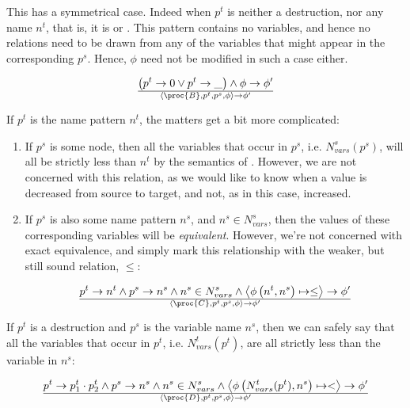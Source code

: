 This has a symmetrical case. Indeed when $p^t$ is neither a destruction, nor
any name $n^t$, that is, it is \mono{\_} or . This pattern contains no
variables, and hence  no relations need to be drawn from any of the variables
that might appear in the corresponding $p^s$. Hence, $\phi$ need not be
modified in such a case either.

\begin{equation}
{
\left(
    p^t\rightarrow 0
\vee
    p^t\rightarrow \_
\right)
  \wedge
    \phi\rightarrow\phi'
}\over{
  \left\langle\proc{B},p^t,p^s,\phi\right\rangle
  \rightarrow
  \phi'
}
\end{equation}

If $p^t$ is the name pattern $n^t$, the matters get a bit more complicated:

\begin{enumerate}

\item If $p^s$ is some node, then all the variables that occur in $p^s$, i.e.
$N_{vars}^s(p^s)$, will all be strictly less than $n^t$ by the semantics of
\D{}. However, we are not concerned with this relation, as we would like to
know when a value is decreased from source to target, and not, as in this case,
increased.

\item If $p^s$ is also some name pattern $n^s$, and  $n^s\in N^s_{vars}$, then
the values of these corresponding variables will be \emph{equivalent}. However,
we're not concerned with exact equivalence, and simply mark this relationship
with the weaker, but still sound relation, $\leq$:

\begin{equation}
{
    p^t\rightarrow n^t
  \wedge
    p^s\rightarrow n^s
  \wedge
    n^s\in N_{vars}^s
  \wedge
    \left\langle\phi\left(n^t, n^s\right)\mapsto \leq\right\rangle\rightarrow\phi'
}\over{
  \left\langle\proc{C},p^t,p^s,\phi\right\rangle
  \rightarrow
  \phi'
}
\end{equation}

\end{enumerate}

If $p^t$ is a destruction and $p^s$ is the variable name $n^s$, then we can safely say that
all the variables that occur in $p^t$, i.e. $N_{vars}^t(p^t)$, are all strictly less
than the variable in $n^s$:

\begin{equation}
{
    p^t\rightarrow p^t_1\cdot p^t_2
  \wedge
    p^s\rightarrow n^s
  \wedge
    n^s\in N_{vars}^s
  \wedge
    \left\langle\phi\left(N_{vars}^t(p^t), n^s\right)\mapsto <\right\rangle\rightarrow\phi'
}\over{
  \left\langle\proc{D},p^t,p^s,\phi\right\rangle
  \rightarrow
  \phi'
}
\end{equation}

